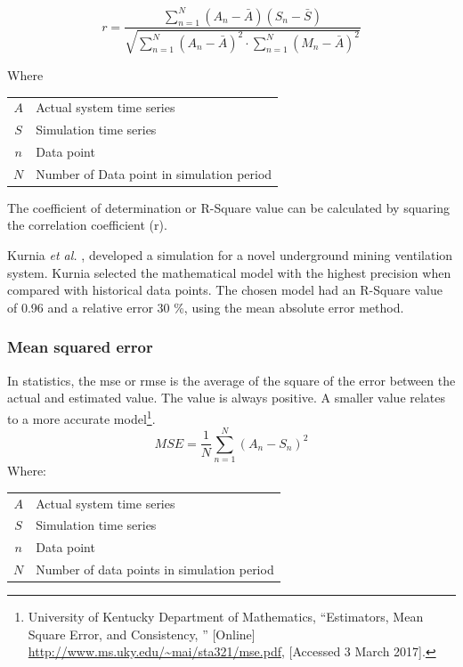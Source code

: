  		\begin{equation}
 		\label{eq: Correlation coefficient}
 		r = \dfrac{\sum_{n=1}^{N}(A_n - \bar{A})(S_n - \bar{S})}{\sqrt{\sum_{n=1}^{N}(A_n - \bar{A})^2 \cdot \sum_{n=1}^{N}(M_n - \bar{A})^2}}
 		\end{equation}
 		\par
 		Where \par
 		\begin{table}[!htbp]
 			\centering
 			\begin{tabular}{cl}
 				$A$ & Actual system time series \\
 				$S$ & Simulation time series \\
 				$n$ & Data point \\
 				$N$ & Number of Data point in simulation period \\
 			\end{tabular} 
 		\end{table}	
 		The coefficient of determination or R-Square value can be calculated by squaring the correlation coefficient (r). 
 		\par 
 			Kurnia \textit{et al.} \cite{kurnia2014simulation}, \cite{kurnia2014dust} developed a simulation for a novel underground mining ventilation system. Kurnia selected the mathematical model with the highest precision when compared with historical data points. The chosen model had an R-Square value of 0.96 and a relative error 30 \%, using the mean absolute error method. 
 			
 		\subsubsection{Mean squared error}	
 		In statistics, the \gls{mse} or \gls{rmse} is the average of the square of the error between the actual and estimated value. The value is always positive. A smaller value relates to a more accurate model\footnote{University of Kentucky Department of Mathematics, \enquote{Estimators, Mean Square Error, and
 			Consistency, } [Online] \url{http://www.ms.uky.edu/~mai/sta321/mse.pdf}, [Accessed 3 March 2017].}.
 			\begin{equation}
 				\label{eq: rmse}
 				MSE = \dfrac{1}{N}\sum_{n=1}^{N}{(A_{n} - S_{n})^2}
 			\end{equation}
 			Where: \par
 			\begin{table}[!htbp]
 				\centering
 				\begin{tabular}{cl}
 					$A$ & Actual system time series \\
 					$S$ & Simulation time series \\
 					$n$ & Data point \\
 					$N$ & Number of data points in simulation period \\
 			\end{tabular} 
 			\end{table}			
